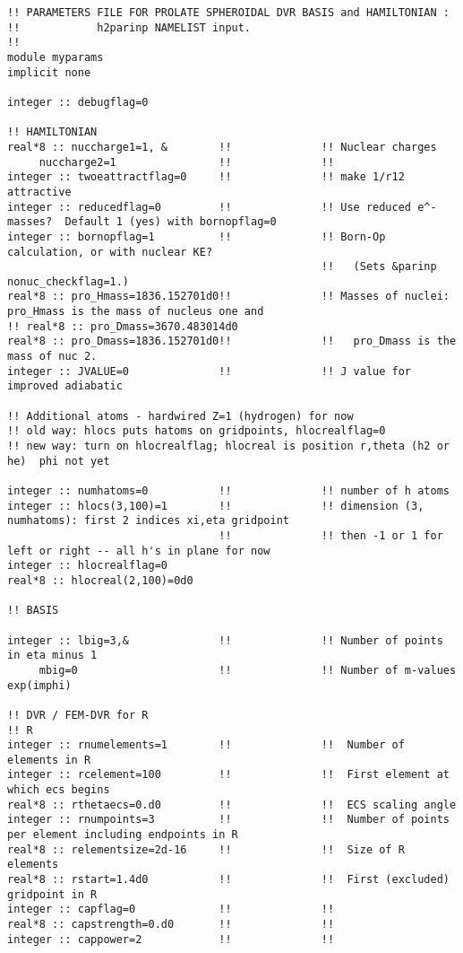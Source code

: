 \begin{verbatim}
!! PARAMETERS FILE FOR PROLATE SPHEROIDAL DVR BASIS and HAMILTONIAN :
!!            h2parinp NAMELIST input.
!!
module myparams
implicit none

integer :: debugflag=0

!! HAMILTONIAN
real*8 :: nuccharge1=1, &        !!              !! Nuclear charges
     nuccharge2=1                !!              !!
integer :: twoeattractflag=0     !!              !! make 1/r12 attractive
integer :: reducedflag=0         !!              !! Use reduced e^- masses?  Default 1 (yes) with bornopflag=0
integer :: bornopflag=1          !!              !! Born-Op calculation, or with nuclear KE?
                                                 !!   (Sets &parinp nonuc_checkflag=1.)
real*8 :: pro_Hmass=1836.152701d0!!              !! Masses of nuclei: pro_Hmass is the mass of nucleus one and 
!! real*8 :: pro_Dmass=3670.483014d0 
real*8 :: pro_Dmass=1836.152701d0!!              !!   pro_Dmass is the mass of nuc 2.
integer :: JVALUE=0              !!              !! J value for improved adiabatic

!! Additional atoms - hardwired Z=1 (hydrogen) for now
!! old way: hlocs puts hatoms on gridpoints, hlocrealflag=0
!! new way: turn on hlocrealflag; hlocreal is position r,theta (h2 or he)  phi not yet

integer :: numhatoms=0           !!              !! number of h atoms 
integer :: hlocs(3,100)=1        !!              !! dimension (3, numhatoms): first 2 indices xi,eta gridpoint
                                 !!              !! then -1 or 1 for left or right -- all h's in plane for now
integer :: hlocrealflag=0
real*8 :: hlocreal(2,100)=0d0

!! BASIS

integer :: lbig=3,&              !!              !! Number of points in eta minus 1
     mbig=0                      !!              !! Number of m-values exp(imphi)

!! DVR / FEM-DVR for R
!! R
integer :: rnumelements=1        !!              !!  Number of elements in R
integer :: rcelement=100         !!              !!  First element at which ecs begins
real*8 :: rthetaecs=0.d0         !!              !!  ECS scaling angle
integer :: rnumpoints=3          !!              !!  Number of points per element including endpoints in R
real*8 :: relementsize=2d-16     !!              !!  Size of R elements
real*8 :: rstart=1.4d0           !!              !!  First (excluded) gridpoint in R
integer :: capflag=0             !!              !!
real*8 :: capstrength=0.d0       !!              !!  
integer :: cappower=2            !!              !!  


\end{verbatim}
